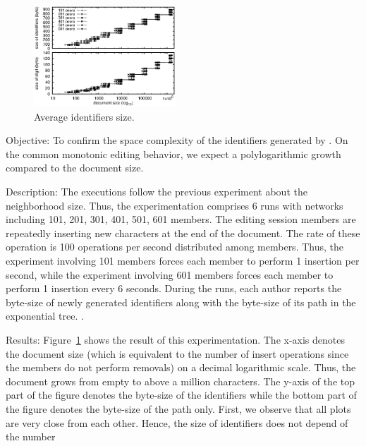 \ \\

\begin{figure}
  \centering
  \includegraphics[width=0.475\textwidth]{./img/identifiers.eps}
  \caption{\label{fig:identifiers} Average identifiers size.}
\end{figure}

\begin{asparadesc}
\item [Objective:] To confirm the space complexity of the identifiers generated
  by \LSEQ. On the common monotonic editing behavior, we expect a
  polylogarithmic growth compared to the document size.
\item [Description:] The executions follow the previous experiment about the
  neighborhood size. Thus, the experimentation comprises 6 runs with networks
  including 101, 201, 301, 401, 501, 601 members. The editing session members
  are repeatedly inserting new characters at the end of the document. The rate
  of these operation is 100 operations per second distributed among
  members. Thus, the experiment involving 101 members forces each member to
  perform 1 insertion per second, while the experiment involving 601 members
  forces each member to perform 1 insertion every 6 seconds. During the runs,
  each author reports the byte-size of newly generated identifiers along with
  the byte-size of its path in the exponential tree. .
\item [Results:] Figure~\ref{fig:identifiers} shows the result of this
  experimentation. The x-axis denotes the document size (which is equivalent to
  the number of insert operations since the members do not perform removals) on
  a decimal logarithmic scale. Thus, the document grows from empty to above a
  million characters. The y-axis of the top part of the figure denotes the
  byte-size of the identifiers while the bottom part of the figure denotes the
  byte-size of the path only. First, we observe that all plots are very close
  from each other. Hence, the size of identifiers does not depend of the number

\end{asparadesc}
